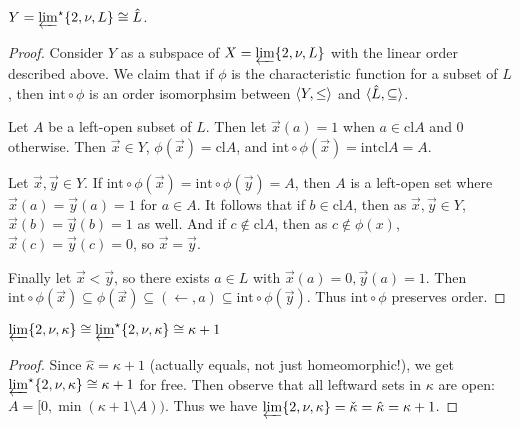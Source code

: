 \documentclass[11pt]{article}
\renewcommand{\int}{\textrm{int}}
\renewcommand{\cl}{\textrm{cl}}
\newcommand{\lexTimes}{\times_{\textrm{lex}}}
\begin{document}
  \begin{theorem}
    \(Y=\varprojlim^\star \{2, \nu, L\}\cong \hat L\).
  \end{theorem}

  \begin{proof}
    Consider \(Y\) as a subspace of \(X=\varprojlim \{2, \nu, L\}\) with
    the linear order described above. We claim that if \(\phi\) is the
    characteristic function for a subset of \(L\), then \(\int\circ\phi\)
    is an order isomorphsim between \(\langle Y,\leq\rangle\) and
    \(\langle\hat L,\subseteq\rangle\).

    Let \(A\) be a left-open subset of \(L\). Then let \(\vec x(a)=1\) when
    \(a\in\cl A\) and \(0\) otherwise. Then \(\vec x\in Y\),
    \(\phi(\vec x)=\cl A\), and \(\int\circ\phi(\vec x)=\int\cl A=A\).

    Let \(\vec x,\vec y\in Y\). If
    \(\int\circ\phi(\vec x)=\int\circ\phi(\vec y)=A\), then \(A\) is a
    left-open set where \(\vec x(a)=\vec y(a)=1\) for \(a\in A\). It follows
    that if \(b\in\cl A\), then as \(\vec x,\vec y\in Y\),
    \(\vec x(b)=\vec y(b)=1\) as well. And if \(c\not\in\cl A\), then
    as \(c\not\in\phi(x)\),
    \(\vec x(c)=\vec y(c)=0\), so \(\vec x=\vec y\).

    Finally let \(\vec x<\vec y\), so there exists \(a\in L\) with
    \(\vec x(a)=0,\vec y(a)=1\). Then
    \(
      \int\circ\phi(\vec x)
        \subseteq
      \phi(\vec x)
        \subseteq
      (\leftarrow,a)
        \subseteq
      \int\circ\phi(\vec y)
    \). Thus \(\int\circ\phi\) preserves order.
  \end{proof}

  \begin{corollary}
    \(
      \varprojlim \{2, \nu, \kappa\}
      \cong
      \varprojlim^\star \{2, \nu, \kappa\}
      \cong
      \kappa+1
    \)
  \end{corollary}

  \begin{proof}
    Since \(\hat\kappa=\kappa+1\) (actually equals, not just homeomorphic!),
    we get \(\varprojlim^\star \{2, \nu, \kappa\}
      \cong
    \kappa+1\) for free. Then observe that all leftward sets in \(\kappa\) are
    open: \(A=[0,\min(\kappa+1\setminus A))\).
    Thus we have \(\varprojlim \{2, \nu, \kappa\}=\check\kappa=\hat\kappa=\kappa+1\).
  \end{proof}



\newpage


\end{document}
